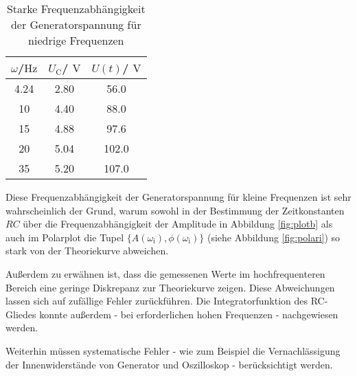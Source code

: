 \begin{table}
	\centering
	\caption{Starke Frequenzabhängigkeit der Generatorspannung für niedrige Frequenzen}
	\label{tab:diskussion}
	\begin{tabular}{ccc}
		\toprule
		$\omega$/$\si{\Hz}$ & $U_\text{C}$/ $\si{\volt}$ & $U(t)$/ $\si{\volt}$ \\
		\midrule
		4.24                & 2.80                       & 56.0                 \\
		10                  & 4.40                       & 88.0                 \\
		15                  & 4.88                       & 97.6                 \\
		20                  & 5.04                       & 102.0                \\
		35                  & 5.20                       & 107.0                \\
		\bottomrule
	\end{tabular}
\end{table}
Diese Frequenzabhängigkeit der Generatorspannung für kleine Frequenzen ist sehr wahrscheinlich der Grund, warum sowohl in der Bestimmung der Zeitkonstanten $RC$ über die Frequenzabhängigkeit der Amplitude in
Abbildung \ref{fig:plotb} als auch im Polarplot die Tupel $\{A(\omega_{\text{i}}), \phi(\omega_{\text{i}}) \}$ (siehe Abbildung \ref{fig:polari}) so stark von der Theoriekurve abweichen.

Außerdem zu erwähnen ist, dass die gemessenen Werte im hochfrequenteren Bereich eine geringe
Diskrepanz zur Theoriekurve zeigen. Diese Abweichungen lassen sich auf zufällige Fehler zurückführen.
Die Integratorfunktion des RC-Gliedes konnte außerdem - bei erforderlichen hohen Frequenzen -
nachgewiesen werden.

Weiterhin müssen systematische Fehler - wie zum Beispiel die Vernachlässigung der Innenwiderstände von Generator und Oszilloskop - berücksichtigt werden.
